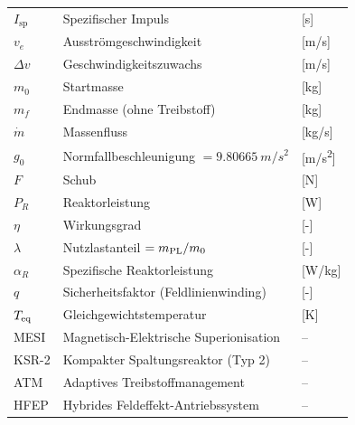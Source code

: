 ﻿\documentclass[a4paper,12pt,twoside]{article}
\theoremstyle{plain}
\theoremstyle{definition}
\theoremstyle{remark}
\newcommand{\Isp}{I_{\mathrm{sp}}}
\newcommand{\ve}{v_e}
\newcommand{\Dv}{\Delta v}
\newcommand{\mdot}{\dot{m}}
\newcommand{\mzero}{m_0}
\newcommand{\mf}{m_f}
\newcommand{\gzero}{g_0}
\begin{document}
	\begin{tabular}{lll}
		$\Isp$ & Spezifischer Impuls & [s]\\
		$\ve$ & Ausströmgeschwindigkeit & [m/s]\\
		$\Dv$ & Geschwindigkeitszuwachs & [m/s]\\
		$\mzero$ & Startmasse & [kg]\\
		$\mf$ & Endmasse (ohne Treibstoff) & [kg]\\
		$\mdot$ & Massenfluss & [kg/s]\\
		$\gzero$ & Normfallbeschleunigung $= \SI{9.80665}{m/s^2}$ & [m/s\textsuperscript{2}]\\
		$F$ & Schub & [N]\\
		$P_R$ & Reaktorleistung & [W]\\
		$\eta$ & Wirkungsgrad & [-]\\
		$\lambda$ & Nutzlastanteil $= m_{\rm PL}/\mzero$ & [-]\\
		$\alpha_R$ & Spezifische Reaktorleistung & [W/kg]\\
		$q$ & Sicherheitsfaktor (Feldlinienwinding) & [-]\\
		$T_{\rm eq}$ & Gleichgewichtstemperatur & [K]\\
		MESI & Magnetisch-Elektrische Superionisation & --\\
		KSR-2 & Kompakter Spaltungsreaktor (Typ 2) & --\\
		ATM & Adaptives Treibstoffmanagement & --\\
		HFEP & Hybrides Feldeffekt-Antriebssystem & --\\
	\end{tabular}
\end{document}
